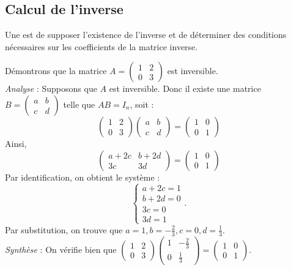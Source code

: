 \documentclass{book}
\begin{document}
\subsection{Calcul de l'inverse}
Une  est de supposer l'existence de l'inverse et de déterminer des conditions nécessaires sur les coefficients de la matrice inverse.  
\begin{Exemple}
Démontrons que la matrice $A =\begin{pmatrix}
1& 2\\
0 &3\end{pmatrix}$ est inversible. \\
\textit{Analyse} : Supposons que $A$ est inversible. Donc il existe une matrice $B =\begin{pmatrix}
a& b\\
c &d\end{pmatrix}$ telle que $AB=I_n$, soit :
$$ \begin{pmatrix}
1& 2\\
0 &3\end{pmatrix}\begin{pmatrix}
a& b\\
c &d\end{pmatrix} = \begin{pmatrix}
1& 0\\
0 &1\end{pmatrix}$$
Ainsi,  
$$\begin{pmatrix}
a+2c& b+2d\\
3c &3d\end{pmatrix}= \begin{pmatrix}
1& 0\\
0 &1\end{pmatrix}$$
Par identification, on obtient le système :
$$\begin{cases}
a+2c =1\\
 b+2d=0\\
3c =0\\
3d=1
\end{cases}.$$
Par substitution, on trouve que  $a = 1, b = -\frac 2 3, c = 0, d = \frac 1 3$.\\
\textit{Synthèse} : On vérifie bien que $\begin{pmatrix}
1& 2\\
0 &3\end{pmatrix}\begin{pmatrix}
1& -\frac 2 3\\
0 &\frac 1 3\end{pmatrix}=\begin{pmatrix}
1& 0\\
0 &1\end{pmatrix}$.
\end{Exemple}
\end{document}
